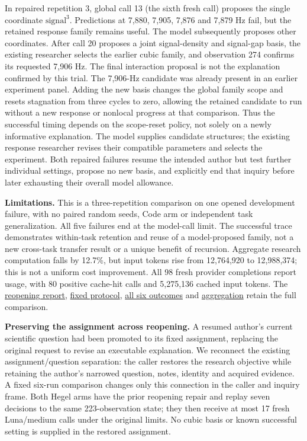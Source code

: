 \documentclass[11pt,a4paper]{article}
\begin{document}
In repaired repetition 3, global call 13 (the sixth fresh call) proposes the single coordinate \(\mathrm{signal}^3\). Predictions at 7,880, 7,905, 7,876 and 7,879 Hz fail, but the retained response family remains useful. The model subsequently proposes other coordinates. After call 20 proposes a joint signal-density and signal-gap basis, the existing researcher selects the earlier cubic family, and observation 274 confirms its requested 7,906 Hz. The final interaction proposal is not the explanation confirmed by this trial. The 7,906-Hz candidate was already present in an earlier experiment panel. Adding the new basis changes the global family scope and resets stagnation from three cycles to zero, allowing the retained candidate to run without a new response or nonlocal progress at that comparison. Thus the successful timing depends on the scope-reset policy, not solely on a newly informative explanation. The model supplies candidate structures; the existing response researcher revises their compatible parameters and selects the experiment. Both repaired failures resume the intended author but test further individual settings, propose no new basis, and explicitly end that inquiry before later exhausting their overall model allowance.


\textbf{Limitations.} This is a three-repetition comparison on one opened development failure, with no paired random seeds, Code arm or independent task generalization. All five failures end at the model-call limit. The successful trace demonstrates within-task retention and reuse of a model-proposed family, not a new cross-task transfer result or a unique benefit of recursion. Aggregate research computation falls by 12.7\%, but input tokens rise from 12,764,920 to 12,988,374; this is not a uniform cost improvement. All 98 fresh provider completions report usage, with 80 positive cache-hit calls and 5,275,136 cached input tokens. The \hyperlink{artifact-127}{reopening report}, \hyperlink{artifact-128}{fixed protocol}, \hyperlink{artifact-129}{all six outcomes} and \hyperlink{artifact-130}{aggregation} retain the full comparison.


\textbf{Preserving the assignment across reopening.} A resumed author's current scientific question had been promoted to its fixed assignment, replacing the original request to revise an executable explanation. We reconnect the existing assignment/question separation: the caller restores the research objective while retaining the author's narrowed question, notes, identity and acquired evidence. A fixed six-run comparison changes only this connection in the caller and inquiry frame. Both Hegel arms have the prior reopening repair and replay seven decisions to the same 223-observation state; they then receive at most 17 fresh Luna/medium calls under the original limits. No cubic basis or known successful setting is supplied in the restored assignment.
\end{document}

